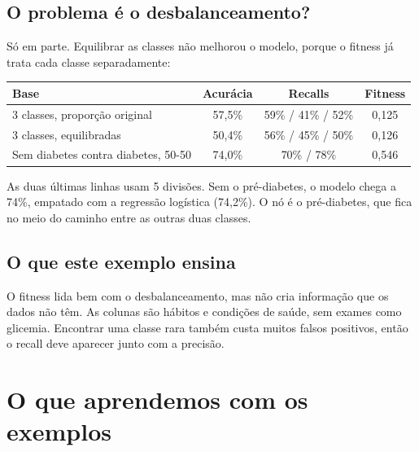 \documentclass[11pt,a4paper]{article}
\newenvironment{tabela}{\par\nopagebreak[4]\vspace{0.3em}\nopagebreak[4]\begingroup\centering\small}{\par\endgroup\vspace{0.6em}}
\begin{document}
\subsection{O problema é o desbalanceamento?}

Só em parte. Equilibrar as classes não melhorou o modelo, porque o fitness já trata cada classe separadamente:

\begin{tabela}
\begin{tabular}{lccc}
\toprule
Base & Acurácia & Recalls & Fitness\\
\midrule
3 classes, proporção original & 57,5\% & 59\% / 41\% / 52\% & 0,125\\
3 classes, equilibradas & 50,4\% & 56\% / 45\% / 50\% & 0,126\\
Sem diabetes contra diabetes, 50-50 & 74,0\% & 70\% / 78\% & 0,546\\
\bottomrule
\end{tabular}
\end{tabela}

As duas últimas linhas usam 5 divisões. Sem o pré-diabetes, o modelo chega a 74\%, empatado com a regressão logística (74,2\%). O nó é o pré-diabetes, que fica no meio do caminho entre as outras duas classes.

\subsection{O que este exemplo ensina}

O fitness lida bem com o desbalanceamento, mas não cria informação que os dados não têm. As colunas são hábitos e condições de saúde, sem exames como glicemia. Encontrar uma classe rara também custa muitos falsos positivos, então o recall deve aparecer junto com a precisão.

\clearpage
\section{O que aprendemos com os exemplos}
\end{document}

